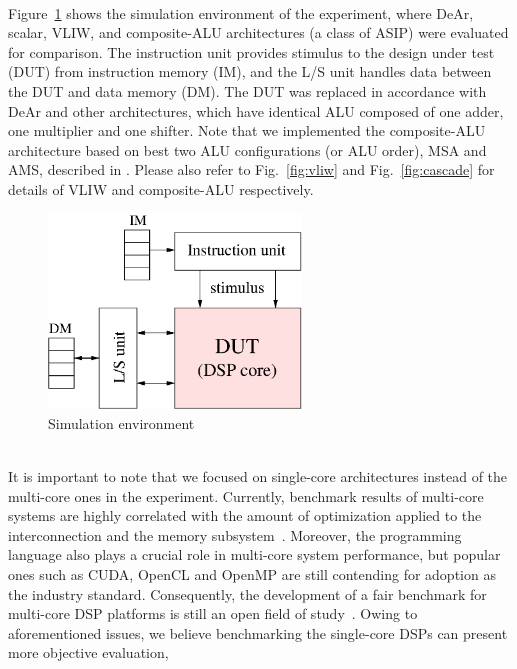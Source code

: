 \\\indent Figure~\ref{fig:sim} shows the simulation environment of the experiment, 
where DeAr, scalar, VLIW, and composite-ALU architectures (a class of ASIP) \cite{cascade} were evaluated for comparison. 
The instruction unit provides stimulus to the design under test (DUT) from instruction memory (IM),
and the L/S unit handles data between the DUT and data memory (DM).
The DUT was replaced in accordance with DeAr and other architectures, 
which have identical ALU composed of one adder, one multiplier and one shifter.
Note that we implemented the composite-ALU architecture based on best two ALU configurations (or ALU order), MSA and AMS, described in \cite{cascade}.
Please also refer to Fig.~\ref{fig:vliw} and Fig.~\ref{fig:cascade} for details of VLIW and composite-ALU respectively.
\vspace{\textfig}
\begin{figure}[!ht] 
    \centering
    \includegraphics[width=0.6\textwidth]{./figs/sim.eps}
    \caption{Simulation environment}
    \label{fig:sim}
\end{figure}
\\\indent 
It is important to note that we focused on single-core architectures instead of the multi-core ones in the experiment.
Currently, benchmark results of multi-core systems are highly correlated with the amount of optimization applied to the interconnection and the memory subsystem~\cite{trends}.
Moreover, the programming language also plays a crucial role in multi-core system performance, 
but popular ones such as CUDA, OpenCL and OpenMP are still contending for adoption as the industry standard.
Consequently, the development of a fair benchmark for multi-core DSP platforms is still an open field of study~\cite{landscape}.
Owing to aforementioned issues, we believe benchmarking the single-core DSPs can present more objective evaluation, 
